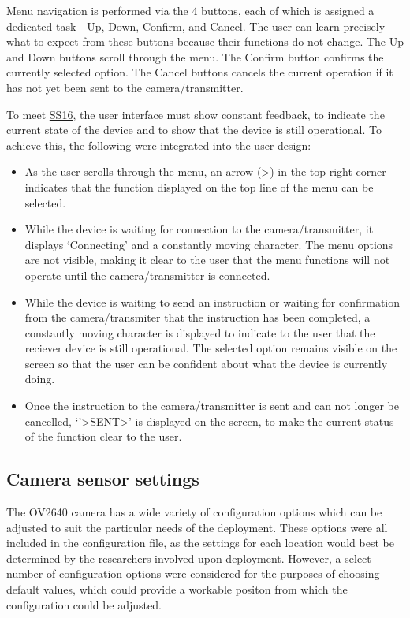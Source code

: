 \documentclass[class=report,11pt,crop=false]{standalone}
\begin{document}
Menu navigation is performed via the 4 buttons, each of which is assigned a dedicated task - Up, Down, Confirm, and Cancel. The user can learn precisely what to expect from these buttons because their functions do not change. The Up and Down buttons scroll through the menu. The Confirm button confirms the currently selected option. The Cancel buttons cancels the current operation if it has not yet been sent to the camera/transmitter.

To meet \hyperlink{tab:firmware-requirements}{SS16}, the user interface must show constant feedback, to indicate the current state of the device and to show that the device is still operational. To achieve this, the following were integrated into the user design:

\begin{itemize}
    \item As the user scrolls through the menu, an arrow (>) in the top-right corner indicates that the function displayed on the top line of the menu can be selected.
    \item While the device is waiting for connection to the camera/transmitter, it displays `Connecting' and a constantly moving character. The menu options are not visible, making it clear to the user that the menu functions will not operate until the camera/transmitter is connected.
    \item While the device is waiting to send an instruction or waiting for confirmation from the camera/transmiter that the instruction has been completed, a constantly moving character is displayed to indicate to the user that the reciever device is still operational. The selected option remains visible on the screen so that the user can be confident about what the device is currently doing.
    \item Once the instruction to the camera/transmitter is sent and can not longer be cancelled, `'>SENT>' is displayed on the screen, to make the current status of the function clear to the user.
\end{itemize}

\subsection{Camera sensor settings}

The OV2640 camera has a wide variety of configuration options which can be adjusted to suit the particular needs of the deployment. These options were all included in the configuration file, as the settings for each location would best be determined by the researchers involved upon deployment. However, a select number of configuration options were considered for the purposes of choosing default values, which could provide a workable positon from which the configuration could be adjusted. 
\end{document}
